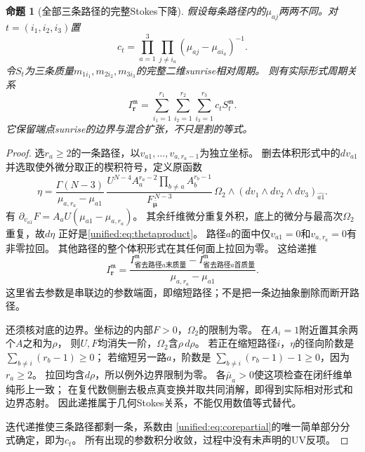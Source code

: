 \documentclass[11pt,a4paper,oneside]{ctexart}
\theoremstyle{cnplain}
\newtheorem{proposition}[theorem]{命题}
\theoremstyle{definition}
\theoremstyle{remark}
\numberwithin{equation}{section}
\begin{document}
\begin{proposition}[全部三条路径的完整Stokes下降]\label{unified:prop:thetastokes}
假设每条路径内的$\mu_{aj}$两两不同。对
$t=(i_1,i_2,i_3)$置
\[
 c_t=\prod_{a=1}^3\prod_{j\ne i_a}(\mu_{aj}-\mu_{ai_a})^{-1}.
\]
令$S_t$为三条质量$m_{1i_1},m_{2i_2},m_{3i_3}$的完整二维sunrise相对周期。
则有实际形式周期关系
\begin{equation}\label{unified:eq:thetaformal}
 I_{\mathbf r}^{\mathfrak m}=\sum_{i_1=1}^{r_1}
       \sum_{i_2=1}^{r_2}\sum_{i_3=1}^{r_3}c_tS_t^{\mathfrak m}.
\end{equation}
它保留端点sunrise的边界与混合扩张，不只是割的等式。
\end{proposition}
\begin{proof}
选$r_a\ge2$的一条路径，以$v_{a1},\ldots,v_{a,r_a-1}$为独立坐标。
删去体积形式中的$dv_{a1}$并选取使外微分取正的楔积符号，定义原函数
\[
 \eta=
 \frac{\Gamma(N-3)}{\mu_{a,r_a}-\mu_{a1}}\,
 \frac{U^{N-4}A_a^{r_a-2}\prod_{b\ne a}A_b^{r_b-1}}
      {F_{\bar{\boldsymbol\mu}}^{\,N-3}}\,
 \Omega_2\wedge (dv_1\wedge dv_2\wedge dv_3)_{\widehat{a1}} .
\]
有
$\partial_{v_{a1}}F=A_aU(\mu_{a1}-\mu_{a,r_a})$。
其余纤维微分重复外积，底上的微分与最高次$\Omega_2$重复，故$d\eta$
正好是\eqref{unified:eq:thetaproduct}。
路径$a$的面中仅$v_{a1}=0$和$v_{a,r_a}=0$有非零拉回。
其他路径的整个体积形式在其任何面上拉回为零。
这给递推
\[
 I_{\mathbf r}^{\mathfrak m}
 =\frac{I_{\text{省去路径$a$末质量}}^{\mathfrak m}
          -I_{\text{省去路径$a$首质量}}^{\mathfrak m}}
        {\mu_{a,r_a}-\mu_{a1}} .
\]
这里省去参数是串联边的参数端面，即缩短路径；不是把一条边抽象删除而断开路径。

还须核对底的边界。坐标边的内部$F>0$，$\Omega_2$的限制为零。
在$A_i=1$附近置其余两个$A$之和为$\rho$，
则$U,F$均消失一阶，$\Omega_2$含$\rho\,d\rho$。
若正在缩短路径$i$，$\eta$的径向阶数是
$\sum_{b\ne i}(r_b-1)\ge0$；
若缩短另一路$a$，阶数是
$\sum_{b\ne i}(r_b-1)-1\ge0$，因为$r_a\ge2$。
拉回均含$d\rho$，所以例外边界限制为零。
各$\bar\mu_a>0$使这项检查在闭纤维单纯形上一致；
在复代数侧删去极点真变换并取共同消解，即得到实际相对形式和边界态射。
因此递推属于几何Stokes关系，不能仅用数值等式替代。

迭代递推使三条路径都剩一条，系数由
\eqref{unified:eq:corepartial}的唯一简单部分分式确定，即为$c_t$。
所有出现的参数积分收敛，过程中没有未声明的UV反项。
\end{proof}
\end{document}
